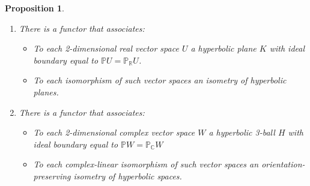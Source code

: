 \documentclass[11pt]{article}
\numberwithin{equation}{section}
\newcounter{count}
\theoremstyle{plain}
\newtheorem{proposition}[count]{Proposition}
\theoremstyle{remark}
\newcommand{\R}{\mathbb{R}}
\begin{document}
\begin{proposition}
\text{}
\begin{enumerate}
\itemsep0em 
\item{\label{functor2}
There is a functor that associates:
	\begin{itemize}
	\itemsep0em 
	\item{To each 2-dimensional real vector space $U$ a hyperbolic plane $K$ with ideal boundary equal to $\mathbb{P}U=\mathbb{P}_{\R}U$.}
	\item{To each isomorphism of such vector spaces an isometry of hyperbolic planes.}
	\end{itemize}
}
\item{\label{functor2c}
There is a functor that associates:
	\begin{itemize}
	\itemsep0em 
	\item{To each 2-dimensional complex vector space $W$ a hyperbolic 3-ball $H$ with ideal boundary equal to $\mathbb{P}W=\mathbb{P}_{\mathbb{C}}W$}
	\item{To each complex-linear isomorphism of such vector spaces an orientation-preserving isometry of hyperbolic spaces.}
	\end{itemize}
}
\end{enumerate}
\end{proposition}
\end{document}
